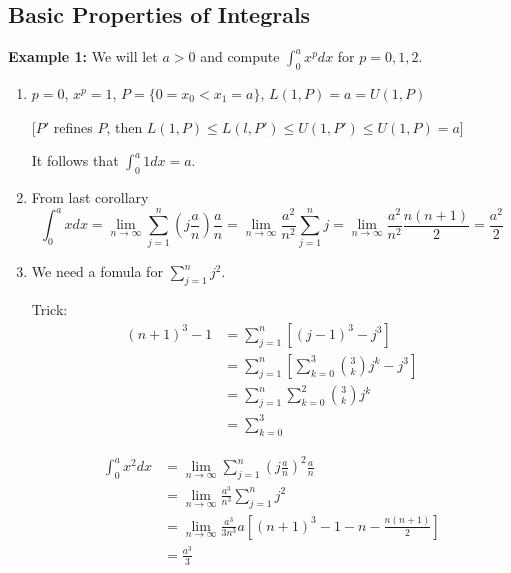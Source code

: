 \documentclass[12pt]{article}
\theoremstyle{plain}
\begin{document}
	\newpage
	\subsection{Basic Properties of Integrals}
	{\color{Brown}
	\textbf{Example 1: }
	We will let $a>0$ and compute $\int_0^a x^p dx$ for $p = 0, 1, 2$.
	\begin{enumerate}
		\item $p=0$, $x^p = 1$, $P = \{0 = x_0<x_1=a\}$, 
			$L(1,P) = a = U(1,P)$ 

			[$P'$ refines $P$, then $L(1,P) \leq L(l,P')\leq U(1,P') \leq 
			U(1,P) = a$]

			It follows that $\int_0^a 1 dx = a$. 
		\item From last corollary 
			\[
				\int_0^a x dx 
				= \lim_{n\to\infty} \sum_{j=1}^n (j\frac an)\frac an
				= \lim_{n\to\infty} \frac{a^2}{n^2} \sum_{j=1}^n j
				=\lim_{n\to\infty} \frac{a^2}{n^2} \frac{n(n+1)}2
				=\frac{a^2}2
			\]
		\item We need a fomula for $\sum_{j=1}^n j^2$. 

			Trick: 
			\begin{align*}
				(n+1)^3 - 1 
				&= \sum_{j=1}^n [(j-1)^3 - j^3] \tag{telescope}\\
				&= \sum_{j=1}^n [\sum_{k=0}^3 \binom{3}{k} j^k - j^3] 
				\tag{binomial theorem} \\
				&= \sum_{j=1}^n \sum_{k=0}^2 \binom{3}{k} j^k \\
				&= \sum_{k=0}^3 
			\end{align*}

			\begin{align*}
				\int_0^a x^2 dx 
				&= \lim_{n\to\infty} \sum_{j=1}^n (j\frac an)^2 \frac an\\
				&= \lim_{n\to\infty} \frac {a^3}{n^3} \sum_{j=1}^n j^2\\
				&= \lim_{n\to\infty} \frac{a^3}{3n^3} 
	a			[(n+1)^3-1-n-\frac{n(n+1)}2]\\
				&= \frac{a^3}3
			\end{align*}
	\end{enumerate}
	}
\end{document}
